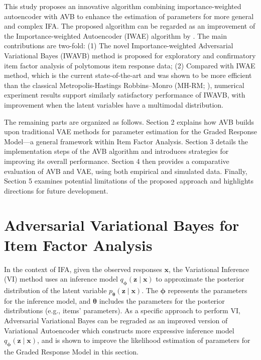 \documentclass[a4paper,12pt]{article}
\theoremstyle{plain} %
\theoremstyle{remark} %
\theoremstyle{definition} %
\begin{document}
This study proposes an innovative algorithm combining importance-weighted autoencoder \citep{burda2015importance} with AVB to enhance the estimation of parameters for more general and complex IFA. The proposed algorithm can be regarded as an improvement of the Importance-weighted Autoencoder (IWAE) algorithm by \citet{urban2021deep}. The main contributions are two-fold: (1) The novel Importance-weighted Adversarial Variational Bayes (IWAVB) method is proposed for exploratory and confirmatory item factor analysis of polytomous item response data; (2) Compared with IWAE method, which is the current state-of-the-art and was shown to be more efficient than the classical Metropolis-Hastings Robbins–Monro (MH-RM; \citealp{cai2010high}), numerical experiment results support similarly satisfactory performance of IWAVB, with improvement when the latent variables have a multimodal distribution.

The remaining parts are organized as follows. Section 2 explains how AVB builds upon traditional VAE methods for parameter estimation for the Graded Response Model---a general framework within Item Factor Analysis. Section 3 details the implementation steps of the AVB algorithm and introduces strategies for improving its overall performance. Section 4 then provides a comparative evaluation of AVB and VAE, using both empirical and simulated data. Finally, Section 5 examines potential limitations of the proposed approach and highlights directions for future development.

\section{Adversarial Variational Bayes for Item Factor Analysis}

In the context of IFA, given the observed responses $\bm{x}$, the Variational Inference (VI) method uses an inference model $q_{\bm{\phi}}(\bm{z}\mid\bm{x})$ to approximate the posterior distribution of the latent variable $p_{\bm{\theta}}(\bm{z}\mid\bm{x})$. The $\bm{\phi}$ represents the parameters for the inference model, and ${\bm{\theta}}$ includes the parameters for the posterior distributions (e.g., items' parameters). As a specific approach to perform VI, Adversarial Variational Bayes can be regraded as an improved version of Variational Autoencoder which constructs more expressive inference model $q_{\bm{\phi}}(\bm{z}\mid\bm{x})$, and is shown to improve the likelihood estimation of parameters for the Graded Response Model in this section.
\end{document}
